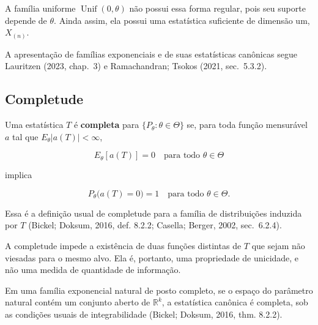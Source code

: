 \documentclass[
  letterpaper,
  DIV=11,
  numbers=noendperiod]{scrreprt}
\begin{document}
A família uniforme \(\operatorname{Unif}(0,\theta)\) não possui essa
forma regular, pois seu suporte depende de \(\theta\). Ainda assim, ela
possui uma estatística suficiente de dimensão um, \(X_{(n)}\).

A apresentação de famílias exponenciais e de suas estatísticas canônicas
segue Lauritzen (2023, chap.~3) e Ramachandran; Tsokos (2021,
sec.~5.3.2).

\subsection*{Completude}\label{completude}

\begin{tcolorbox}[enhanced jigsaw, colback=white, leftrule=.75mm, colbacktitle=quarto-callout-important-color!10!white, breakable, titlerule=0mm, bottomtitle=1mm, title=\textcolor{quarto-callout-important-color}{\faExclamation}\hspace{0.5em}{Definição --- Completude}, colframe=quarto-callout-important-color-frame, toprule=.15mm, opacityback=0, bottomrule=.15mm, opacitybacktitle=0.6, arc=.35mm, toptitle=1mm, rightrule=.15mm, coltitle=black, left=2mm]

Uma estatística \(T\) é \textbf{completa} para
\(\{P_\theta:\theta\in\Theta\}\) se, para toda função mensurável \(a\)
tal que \(E_\theta|a(T)|<\infty\),

\[E_\theta[a(T)]=0
\quad\text{para todo }\theta\in\Theta\]

implica

\[P_\theta\bigl(a(T)=0\bigr)=1
\quad\text{para todo }\theta\in\Theta.\]

Essa é a definição usual de completude para a família de distribuições
induzida por \(T\) (Bickel; Doksum, 2016, def. 8.2.2; Casella; Berger,
2002, sec.~6.2.4).

\end{tcolorbox}

A completude impede a existência de duas funções distintas de \(T\) que
sejam não viesadas para o mesmo alvo. Ela é, portanto, uma propriedade
de unicidade, e não uma medida de quantidade de informação.

\begin{tcolorbox}[enhanced jigsaw, colback=white, leftrule=.75mm, colbacktitle=quarto-callout-important-color!10!white, breakable, titlerule=0mm, bottomtitle=1mm, title=\textcolor{quarto-callout-important-color}{\faExclamation}\hspace{0.5em}{Teorema --- Completude em famílias exponenciais}, colframe=quarto-callout-important-color-frame, toprule=.15mm, opacityback=0, bottomrule=.15mm, opacitybacktitle=0.6, arc=.35mm, toptitle=1mm, rightrule=.15mm, coltitle=black, left=2mm]

Em uma família exponencial natural de posto completo, se o espaço do
parâmetro natural contém um conjunto aberto de \(\mathbb{R}^k\), a
estatística canônica é completa, sob as condições usuais de
integrabilidade (Bickel; Doksum, 2016, thm. 8.2.2).

\end{tcolorbox}
\end{document}
